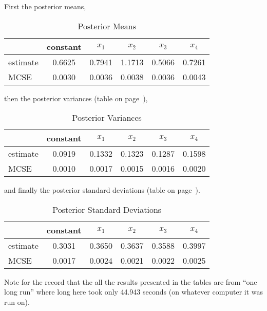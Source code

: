 \documentclass{article}
\begin{document}
First the posterior means,
\begin{table}[ht]
\caption{Posterior Means}
\label{tab:mu}
\begin{center}
\begin{tabular}{lccccc}
  \hline
 & constant & $x_1$ & $x_2$ & $x_3$ & $x_4$ \\ 
  \hline
estimate & 0.6625 & 0.7941 & 1.1713 & 0.5066 & 0.7261 \\ 
  MCSE & 0.0030 & 0.0036 & 0.0038 & 0.0036 & 0.0043 \\ 
   \hline
\end{tabular}\end{center}
\end{table}
then the posterior variances (table on page~\pageref{tab:sigmasq}),
\begin{table}[ht]
\caption{Posterior Variances}
\label{tab:sigmasq}
\begin{center}
\begin{tabular}{lccccc}
  \hline
 & constant & $x_1$ & $x_2$ & $x_3$ & $x_4$ \\ 
  \hline
estimate & 0.0919 & 0.1332 & 0.1323 & 0.1287 & 0.1598 \\ 
  MCSE & 0.0010 & 0.0017 & 0.0015 & 0.0016 & 0.0020 \\ 
   \hline
\end{tabular}\end{center}
\end{table}
and finally the posterior standard deviations
(table on page~\pageref{tab:sigma}).
\begin{table}[ht]
\caption{Posterior Standard Deviations}
\label{tab:sigma}
\begin{center}
\begin{tabular}{lccccc}
  \hline
 & constant & $x_1$ & $x_2$ & $x_3$ & $x_4$ \\ 
  \hline
estimate & 0.3031 & 0.3650 & 0.3637 & 0.3588 & 0.3997 \\ 
  MCSE & 0.0017 & 0.0024 & 0.0021 & 0.0022 & 0.0025 \\ 
   \hline
\end{tabular}\end{center}
\end{table}

Note for the record that the all the results presented in the tables
are from ``one long run'' where long here took only
44.943 seconds (on whatever computer it was run on).
\end{document}
